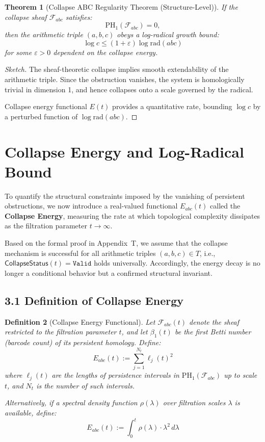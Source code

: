 \documentclass[11pt]{article}
\newtheorem{theorem}{Theorem}[section]
\newtheorem{definition}[theorem]{Definition}
\begin{document}
\begin{theorem}[Collapse ABC Regularity Theorem (Structure-Level)]
If the collapse sheaf $\mathcal{F}_{abc}$ satisfies:
\[
\mathrm{PH}_1(\mathcal{F}_{abc}) = 0,
\]
then the arithmetic triple $(a,b,c)$ obeys a log-radical growth bound:
\[
\log c \leq (1 + \varepsilon) \log \mathrm{rad}(abc)
\]
for some $\varepsilon > 0$ dependent on the collapse energy.
\end{theorem}

\begin{proof}[Sketch]
The sheaf-theoretic collapse implies smooth extendability of the arithmetic triple. Since the obstruction vanishes, the system is homologically trivial in dimension 1, and hence collapses onto a scale governed by the radical.

Collapse energy functional $E(t)$ provides a quantitative rate, bounding $\log c$ by a perturbed function of $\log \mathrm{rad}(abc)$.
\end{proof}




\section{Collapse Energy and Log-Radical Bound}

To quantify the structural constraints imposed by the vanishing of persistent obstructions, we now introduce a real-valued functional \( E_{abc}(t) \) called the \textbf{Collapse Energy}, measuring the rate at which topological complexity dissipates as the filtration parameter \( t \to \infty \).

Based on the formal proof in Appendix~T, we assume that the collapse mechanism is successful for all arithmetic triples \( (a,b,c) \in T \), i.e., \( \mathsf{CollapseStatus}(t) = \texttt{Valid} \) holds universally.  
Accordingly, the energy decay is no longer a conditional behavior but a confirmed structural invariant.

\subsection{3.1 Definition of Collapse Energy}

\begin{definition}[Collapse Energy Functional]
Let \( \mathcal{F}_{abc}(t) \) denote the sheaf restricted to the filtration parameter \( t \), and let \( \beta_1(t) \) be the first Betti number (barcode count) of its persistent homology. Define:
\[
E_{abc}(t) := \sum_{j=1}^{N_t} \ell_j(t)^2
\]
where \( \ell_j(t) \) are the lengths of persistence intervals in \( \mathrm{PH}_1(\mathcal{F}_{abc}) \) up to scale \( t \), and \( N_t \) is the number of such intervals.

Alternatively, if a spectral density function \( \rho(\lambda) \) over filtration scales \( \lambda \) is available, define:
\[
E_{abc}(t) := \int_0^t \rho(\lambda) \cdot \lambda^2 \, d\lambda
\]
\end{definition}
\end{document}

